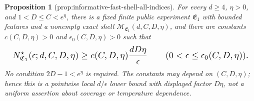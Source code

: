 \documentclass{article}
\newtheorem{proposition}{Proposition}
\begin{document}
\begin{proposition}[prop:informative-fast-shell-all-indices]\label{prop:informative-fast-shell-all-indices}
For every \(d\ge4\), \(\eta>0\), and \(1<D\le C<e^\eta\), there is a fixed finite public experiment \(\mathfrak E_1\) with bounded features and a nonempty exact shell \(\mathcal M_{\mathfrak E_1}(d,C,D,\eta)\), and there are constants \(c(C,D,\eta)>0\) and \(\epsilon_0(C,D,\eta)>0\) such that
\[
\makebox[\linewidth][c]{\resizebox{0.98\linewidth}{!}{\(\displaystyle N^\star_{\mathfrak E_1}(\epsilon;d,C,D,\eta)\ge c(C,D,\eta)\frac{dD\eta}{\epsilon}
\qquad(0<\epsilon\le\epsilon_0(C,D,\eta)).\)}}
\]
No condition \(2D-1<e^\eta\) is required. The constants may depend on \((C,D,\eta)\); hence this is a pointwise local \(d/\epsilon\) lower bound with displayed factor \(D\eta\), not a uniform assertion about coverage or temperature dependence.
\end{proposition}
\end{document}
